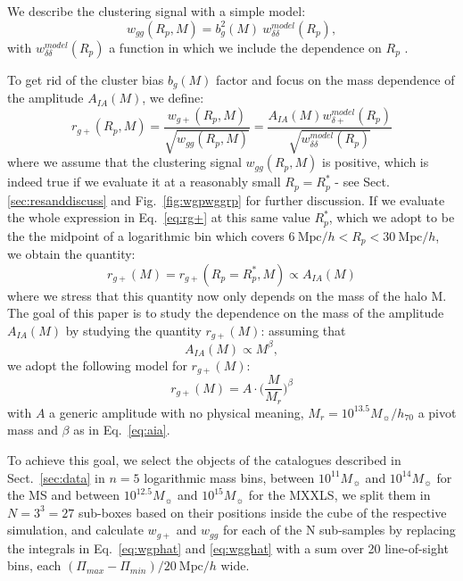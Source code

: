 \documentclass[a4paper,fleqn,usenatbib]{mnras}
\begin{document}
We describe the clustering signal with a simple model:
\begin{equation}
    w_{gg} (R_p, M)=b_g^2 (M)\ w_{\delta \delta}^{model} (R_p), 
	\label{eq:wgg}
\end{equation}
with $w_{\delta \delta}^{model} (R_p)$ a function in which we include the dependence on $R_p$ \citep[equation 9]{vanUitertJoachimi2017}.

To get rid of the cluster bias $b_g (M)$ factor and focus on the mass dependence of the amplitude $A_{IA} (M)$, we define:
\begin{equation}
    r_{g+} (R_p, M)=\frac{w_{g+} (R_p, M)}{\sqrt{w_{gg} (R_p, M)}} =\frac{A_{IA} (M) w_{\delta +}^{model} (R_p) }{\sqrt{w_{\delta \delta}^{model} (R_p)}}
	\label{eq:rg+}
\end{equation}
where we assume that the clustering signal $w_{gg}(R_p, M)$ is positive, which is indeed true if we evaluate it at a reasonably small $R_p = R_p^*$ - see Sect.\ref{sec:resanddiscuss} and Fig.~\ref{fig:wgpwggrp} for further discussion. If we evaluate the whole expression in Eq.~\ref{eq:rg+} at this same value $R_p^*$, which we adopt to be the the midpoint of a logarithmic bin which covers $6 \ \mbox{Mpc}/h < R_p < 30 \ \mbox{Mpc}/h$, we obtain the quantity:
\begin{equation}
    r_{g+} (M) = r_{g+} (R_p = R_p^*, M) \propto A_{IA} (M)
	\label{eq:rg+m}
\end{equation}
where we stress that this quantity now only depends on the mass of the halo M. The goal of this paper is to study the dependence on the mass of the amplitude $A_{IA} (M)$ by studying the quantity $r_{g+} (M)$: assuming that
\begin{equation}
A_{IA} (M)\propto M^{\beta}, 
	\label{eq:aia}
\end{equation}
we adopt the following model for $r_{g+} (M)$:
\begin{equation}
    r_{g+} (M) = A \cdot  \biggl ( \frac{M}{M_r} \biggl )^{\beta}
	\label{eq:modelrg+}
\end{equation}
with $A$ a generic amplitude with no physical meaning, $M_r = 10^{13.5} M_{\sun}/h_{70}$ a pivot mass and $\beta$ as in Eq.~\ref{eq:aia}.

To achieve this goal, we select the objects of the catalogues described in Sect.~\ref{sec:data} in $n = 5$ logarithmic mass bins, between $10^{11} M_{\sun}$ and $10^{14} M_{\sun}$ for the MS and between $10^{12.5} M_{\sun}$ and $10^{15} M_{\sun}$ for the MXXLS, we split them in $N = 3^3 = 27$ sub-boxes based on their positions inside the cube of the respective simulation, and calculate $w_{g+}$ and $w_{gg}$ for each of the N sub-samples by replacing the integrals in Eq.~\ref{eq:wgphat} and \ref{eq:wgghat} with a sum over 20 line-of-sight bins, each $(\Pi_{max} - \Pi_{min})/ 20 \ \mbox{Mpc}/h$ wide.
\end{document}
